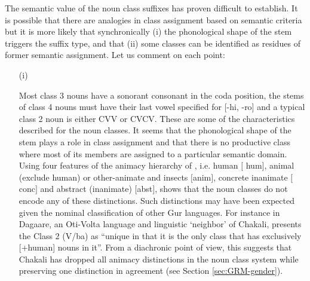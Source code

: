 \begin{exe}
\begin{exe}
\begin{exe}
{\begin{exe}
\begin{exe}
\begin{exe}
\begin{exe}
The semantic value of the noun class suffixes has proven difficult to
establish. It is possible that there are analogies in class assignment based on
semantic criteria but it is more likely that synchronically (i) the phonological
shape of the stem triggers the suffix type, and that (ii) some classes can be
identified as residues of former semantic assignment. Let us comment on each
point: 


\begin{enumerate}
\item[(i)]

Most class 3 nouns have  a sonorant consonant in the coda position,
the stems of  class 4 nouns must have their last vowel specified for  [{\sc -hi,
-ro}] and a typical class 2 noun is either   CVV or CVCV.  These are some of
the characteristics  described for the noun classes. It seems that the
phonological
shape of the stem plays a role in class assignment and that there is no
productive class
where most of its  members are assigned to a particular semantic domain.  Using
four features of the animacy hierarchy
of  \citet{Comr89}, i.e.  human $[${\sc
hum}$]$, animal (exclude human) or other-animate
and insects $[${\sc anim}$]$, concrete inanimate $[${\sc conc}$]$ and abstract
(inanimate) $[${\sc abst}$]$,  \citet{Brin08} shows that the noun
classes  do not encode any of these distinctions. Such
distinctions may have
been  expected given the nominal classification of other Gur languages. For
instance in Dagaare, an Oti-Volta language and linguistic `neighbor' of
Chakali, \citet[124]{Bodo94} presents the Class 2 (V/ba) as ``unique in that it
is the only class that has exclusively [+human] nouns in it''. From a
diachronic point of view, this suggests that Chakali has dropped all animacy
distinctions in the noun class system while preserving one distinction in
agreement (see Section \ref{sec:GRM-gender}).




\end{enumerate}
\end{exe}
\end{exe}
\end{exe}
\end{exe}}
\end{exe}
\end{exe}
\end{exe}
